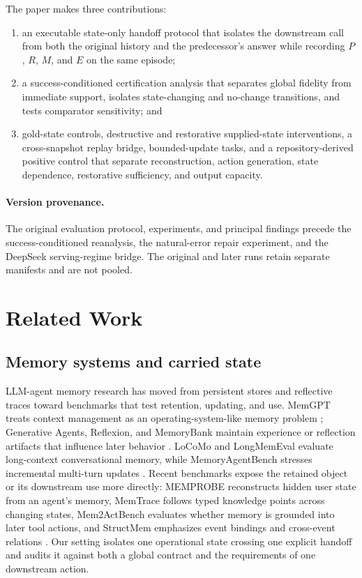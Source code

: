 \documentclass[11pt]{article}
\newcommand{\Rsupport}{R}
\newcommand{\Pstrict}{P}
\newcommand{\Maction}{M}
\newcommand{\Eoutcome}{E}
\begin{document}
The paper makes three contributions:
\begin{enumerate}
    \item an executable state-only handoff protocol that isolates the downstream call from both the original history and the predecessor's answer while recording \(\Pstrict\), \(\Rsupport\), \(\Maction\), and \(\Eoutcome\) on the same episode;
    \item a success-conditioned certification analysis that separates global fidelity from immediate support, isolates state-changing and no-change transitions, and tests comparator sensitivity; and
    \item gold-state controls, destructive and restorative supplied-state interventions, a cross-snapshot replay bridge, bounded-update tasks, and a repository-derived positive control that separate reconstruction, action generation, state dependence, restorative sufficiency, and output capacity.
\end{enumerate}

\paragraph{Version provenance.}
The original evaluation protocol, experiments, and principal findings precede the success-conditioned reanalysis, the natural-error repair experiment, and the DeepSeek serving-regime bridge. The original and later runs retain separate manifests and are not pooled.

\section{Related Work}
\label{sec:related}

\subsection{Memory systems and carried state}

LLM-agent memory research has moved from persistent stores and reflective traces toward benchmarks that test retention, updating, and use. MemGPT treats context management as an operating-system-like memory problem \citep{packer2023memgpt}; Generative Agents, Reflexion, and MemoryBank maintain experience or reflection artifacts that influence later behavior \citep{park2023generative,shinn2023reflexion,zhong2024memorybank}. LoCoMo and LongMemEval evaluate long-context conversational memory, while MemoryAgentBench stresses incremental multi-turn updates \citep{maharana2024locomo,wu2025longmemeval,hu2025memoryagentbench}. Recent benchmarks expose the retained object or its downstream use more directly: MEMPROBE reconstructs hidden user state from an agent's memory, MemTrace follows typed knowledge points across changing states, Mem2ActBench evaluates whether memory is grounded into later tool actions, and StructMem emphasizes event bindings and cross-event relations \citep{ma2026memprobe,long2026memtrace,shen2026mem2act,xu2026structmem}. Our setting isolates one operational state crossing one explicit handoff and audits it against both a global contract and the requirements of one downstream action.
\end{document}
